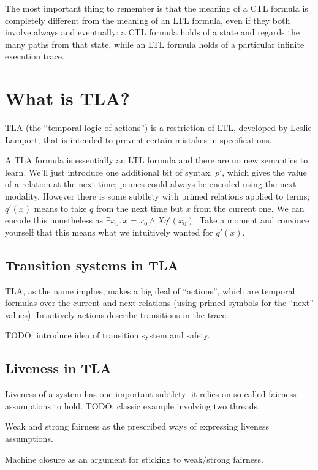 \documentclass{scrbook}
\begin{document}
The most important thing to remember is that the meaning of a CTL formula is
completely different from the meaning of an LTL formula, even if they both
involve always and eventually: a CTL formula holds of a state and regards the
many paths from that state, while an LTL formula holds of a particular infinite
execution trace.

\chapter{What is TLA?}

TLA (the ``temporal logic of actions'') is a restriction of LTL, developed by
Leslie Lamport, that is intended to prevent certain mistakes in specifications.

A TLA formula is essentially an LTL formula and there are no new semantics to
learn. We'll just introduce one additional bit of syntax, $p'$, which gives the
value of a relation at the next time; primes could always be encoded using the
next modality. However there is some subtlety with primed relations applied to
terms; $q'(x)$ means to take $q$ from the next time but $x$ from the current
one. We can encode this nonetheless as $\exists x_0.\, x = x_0 \land X q'(x_0)$.
Take a moment and convince yourself that this means what we intuitively wanted
for $q'(x)$.

\section{Transition systems in TLA}

TLA, as the name implies, makes a big deal of ``actions'', which are temporal
formulas over the current and next relations (using primed symbols for the
``next'' values). Intuitively actions describe transitions in the trace.

TODO: introduce idea of transition system and safety.

\section{Liveness in TLA}

Liveness of a system has one important subtlety: it relies on so-called fairness
assumptions to hold. TODO: classic example involving two threads.

Weak and strong fairness as the prescribed ways of expressing liveness
assumptions.

Machine closure as an argument for sticking to weak/strong fairness.
\end{document}
